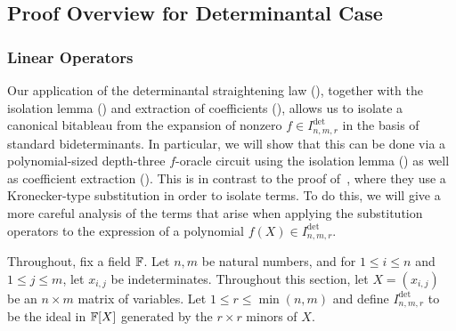 \documentclass[letterpaper, 11pt]{amsart}
\newif\iffull
\begin{document}
\iffull
\begin{thrm}[{Informal version of~\cite[Theorem 4.10, Corollary 4.11]{DG25}}]\label{thrm:pfaff_main}
  Let $\F$ be a field of characteristic zero.
  Let $X = (x_{i,j})_{1 \leq i < j \leq 2n}$ be a $2n \times 2n$ skew-symmetric matrix of variables over $\F$ so that $x_{j, i} = -x_{i, j}$ for $1 \leq j < i \leq n$ and $x_{i, i} = 0$ for $1 \leq i \leq 2n$.
  Let $I^{\pfaff}_{2n, 2r} \subseteq \F[X] = \F[x_{i,j} \mid 1 \leq i < j \leq 2n]$ be the ideal generated by the $2r \times 2r$ principal Pfaffians of $X$.
  Let $f \in I^{\pfaff}_{2n, 2r}$ be a nonzero polynomial.
  Then, there exists a depth-three $f$-oracle circuit of size $\poly(n, \deg(f))$ that computes the $t \times t$ Pfaffian of a skew-symmetric matrix for $t = \bigTheta{r^{1/3}}$.
\end{thrm}
\fi

\subsection{Proof Overview for Determinantal Case}

\subsubsection{Linear Operators}

Our application of the determinantal straightening law  (), together with the isolation lemma () and extraction of coefficients (), allows us to isolate a canonical bitableau from the expansion of nonzero $f \in I^{\det}_{n, m, r}$ in the basis of standard bideterminants.
In particular, we will show that this can be done via a polynomial-sized depth-three $f$-oracle circuit using the isolation lemma () as well as coefficient extraction ().
This is in contrast to the proof of~\cite{AF22}, where they use a Kronecker-type substitution in order to isolate terms.
To do this, we will give a more careful analysis of the terms that arise when applying the substitution operators to the expression of a polynomial $f(X) \in I^{\det}_{n, m, r}$.

Throughout, fix a field $\F$.
Let $n, m$ be natural numbers, and for $1 \leq i \leq n$ and $1 \leq j \leq m$, let $x_{i, j}$ be indeterminates.
Throughout this section, let $X = (x_{i, j})$ be an $n \times m$ matrix of variables.
Let $1 \leq r \leq \min(n, m)$ and define $I^{\det}_{n, m, r}$ to be the ideal in $\mathbb{F}[X]$ generated by the $r \times r$ minors of $X$.
\end{document}

